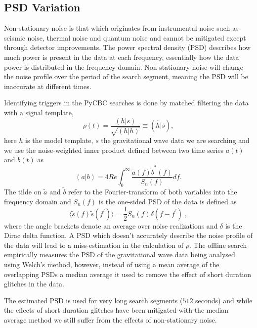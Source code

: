 \subsection{\label{5:sec:psd-var}PSD Variation}

Non-stationary noise is that which originates from instrumental noise such as seismic noise, thermal noise and quantum noise and cannot be mitigated except through detector improvements. The power spectral density (PSD) describes how much power is present in the data at each frequency, essentially how the data power is distributed in the frequency domain. Non-stationary noise will change the noise profile over the period of the search segment, meaning the PSD will be inaccurate at different times. 

Identifying triggers in the PyCBC searches is done by matched filtering the data with a signal template,
%
\begin{equation}
  \rho(t) = \frac{(h | s)}{\sqrt{(h | h)}} \equiv (\hat{h} | s),
  \label{5:eqn:mf_1}
\end{equation}
%
here $h$ is the model template, $s$ the gravitational wave data we are searching and we use the noise-weighted inner product defined between two time series $a(t)$ and $b(t)$ as
%
\begin{equation}
  (a | b) = 4 Re \int^{\infty}_{0} \frac{\tilde{a}(f) \tilde{b}^*(f)}{S_n(f)} 
  df.
  \label{5:eqn:inner_product}
\end{equation}
%
The tilde on $\tilde{a}$ and $\tilde{b}$ refer to the Fourier-transform of both variables into the frequency domain and $S_n(f)$ is the one-sided PSD of the data is defined as
%
\begin{equation}
  \langle \tilde{s}(f) \tilde{s}(f^\prime) \rangle = \frac{1}{2} S_n(f) \delta(f - f^\prime) \;,
  \label{5:eqn:psd}
\end{equation}
%
where the angle brackets denote an average over noise realizations and $\delta$ is the Dirac delta function. A PSD which doesn't accurately describe the noise profile of the data will lead to a miss-estimation in the calculation of $\rho$. The offline search empirically measures the PSD of the gravitational wave data being analysed using Welch's method, however, instead of using a mean average of the overlapping PSDs a median average it used to remove the effect of short duration glitches in the data.

The estimated PSD is used for very long search segments ($512$ seconds) and while the effects of short duration glitches have been mitigated with the median average method we still suffer from the effects of non-stationary noise. 

